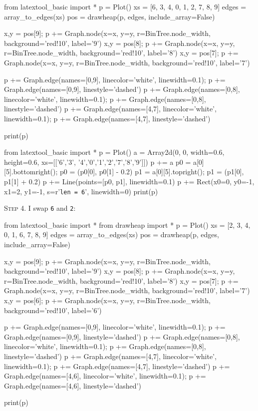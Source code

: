\begin{python}
from latextool_basic import *
p = Plot()
xs = [6, 3, 4, 0, 1, 2, 7, 8, 9]
edges = array_to_edges(xs)
pos = drawheap(p, edges, include_array=False)

x,y = pos[9]; p += Graph.node(x=x, y=y, r=BinTree.node_width, background='red!10', label='9')
x,y = pos[8]; p += Graph.node(x=x, y=y, r=BinTree.node_width, background='red!10', label='8')
x,y = pos[7]; p += Graph.node(x=x, y=y, r=BinTree.node_width, background='red!10', label='7')

p += Graph.edge(names=[0,9], linecolor='white', linewidth=0.1); p += Graph.edge(names=[0,9], linestyle='dashed')
p += Graph.edge(names=[0,8], linecolor='white', linewidth=0.1); p += Graph.edge(names=[0,8], linestyle='dashed')
p += Graph.edge(names=[4,7], linecolor='white', linewidth=0.1); p += Graph.edge(names=[4,7], linestyle='dashed')

print(p)
\end{python}
\begin{python}
from latextool_basic import *
p = Plot()
a = Array2d(0, 0, width=0.6, height=0.6, 
             xs=[['6','3', '4','0','1','2','7','8','9']])
p += a
p0 = a[0][5].bottomright(); p0 = (p0[0], p0[1] - 0.2)
p1 = a[0][5].topright(); p1 = (p1[0], p1[1] + 0.2)
p += Line(points=[p0, p1], linewidth=0.1)
p += Rect(x0=0, y0=-1, x1=2, y1=-1, s=r'\texttt{len = 6}', linewidth=0) 
print(p)
\end{python}

\textsc{Step 4}.
I swap \texttt{6} and \texttt{2}:

\begin{python}
from latextool_basic import *
from drawheap import *
p = Plot()
xs = [2, 3, 4, 0, 1, 6, 7, 8, 9]
edges = array_to_edges(xs)
pos = drawheap(p, edges, include_array=False)

x,y = pos[9]; p += Graph.node(x=x, y=y, r=BinTree.node_width, background='red!10', label='9')
x,y = pos[8]; p += Graph.node(x=x, y=y, r=BinTree.node_width, background='red!10', label='8')
x,y = pos[7]; p += Graph.node(x=x, y=y, r=BinTree.node_width, background='red!10', label='7')
x,y = pos[6]; p += Graph.node(x=x, y=y, r=BinTree.node_width, background='red!10', label='6')

p += Graph.edge(names=[0,9], linecolor='white', linewidth=0.1); p += Graph.edge(names=[0,9], linestyle='dashed')
p += Graph.edge(names=[0,8], linecolor='white', linewidth=0.1); p += Graph.edge(names=[0,8], linestyle='dashed')
p += Graph.edge(names=[4,7], linecolor='white', linewidth=0.1); p += Graph.edge(names=[4,7], linestyle='dashed')
p += Graph.edge(names=[4,6], linecolor='white', linewidth=0.1); p += Graph.edge(names=[4,6], linestyle='dashed')

print(p)
\end{python}

